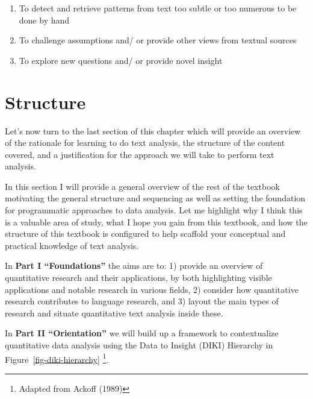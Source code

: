 \documentclass[
  letterpaper,
]{latex/krantz}
\providecommand{\tightlist}{%
  \setlength{\itemsep}{0pt}\setlength{\parskip}{0pt}}\usepackage{longtable,booktabs,array}
\begin{document}
\begin{enumerate}
\def\labelenumi{\arabic{enumi}.}
\tightlist
\item
  To detect and retrieve patterns from text too subtle or too numerous
  to be done by hand
\item
  To challenge assumptions and/ or provide other views from textual
  sources
\item
  To explore new questions and/ or provide novel insight
\end{enumerate}

\hypertarget{structure}{%
\section{Structure}\label{structure}}

Let's now turn to the last section of this chapter which will provide an
overview of the rationale for learning to do text analysis, the
structure of the content covered, and a justification for the approach
we will take to perform text analysis.

In this section I will provide a general overview of the rest of the
textbook motivating the general structure and sequencing as well as
setting the foundation for programmatic approaches to data analysis. Let
me highlight why I think this is a valuable area of study, what I hope
you gain from this textbook, and how the structure of this textbook is
configured to help scaffold your conceptual and practical knowledge of
text analysis.

In \textbf{Part I ``Foundations''} the aims are to: 1) provide an
overview of quantitative research and their applications, by both
highlighting visible applications and notable research in various
fields, 2) consider how quantitative research contributes to language
research, and 3) layout the main types of research and situate
quantitative text analysis inside these.

In \textbf{Part II ``Orientation''} we will build up a framework to
contextualize quantitative data analysis using the Data to Insight
(DIKI) Hierarchy in Figure~\ref{fig-diki-hierarchy} \footnote{Adapted
  from Ackoff (1989)}.
\end{document}
